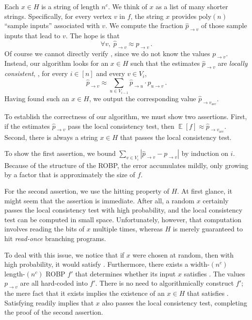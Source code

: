 \documentclass{toc}
\DeclareMathOperator*{\ExpVal}{\mathbb{E}}
\begin{document}
Each $x \in H$ is a string of length $n^c$. We think of $x$ as a list of many shorter strings. Specifically, for every vertex $v$ in $f$, the string $x$ provides $\text{poly}(n)$ ``sample inputs'' associated with $v$. We compute the fraction $\widehat{p}_{\to v}$ of those sample inputs that lead to $v$. The hope is that
\begin{equation} \label{eqn:intro-f'} 
\forall v, \; \widehat{p}_{\rightarrow v} \approx p_{\to v}\,.
\end{equation}
Of course we cannot directly verify , since we do not know the values $p_{\to v}$. Instead, our algorithm looks for an $x \in H$ such that the estimates $\widehat{p}_{\to v}$ are  \emph{locally consistent}, \ie, for every $i \in [n]$ and every $v \in V_i$,
$$
\widehat{p}_{\to v} \approx \sum_{u \in V_{i - 1}} \widehat{p}_{\to u} \cdot p_{u \to v}\,.
$$
Having found such an $x \in H$, we output the corresponding value $\widehat{p}_{\to v_{\text{acc}}}$.

To establish the correctness of our algorithm, we must show two assertions. First, if the estimates $\widehat{p}_{\to v}$ pass the local consistency test, then $\ExpVal[f] \approx \widehat{p}_{\to v_{\text{acc}}}$. Second, there is always a string $x\in H$ that passes the local consistency test.

To show the first assertion, we bound $\sum_{v \in V_i} |\widehat{p}_{\to v} - p_{\to v}|$ by induction on $i$. Because of the structure of the ROBP, the error accumulates mildly, only growing by a factor that is approximately the size of $f$.

For the second assertion, we use the hitting property of $H$. At first glance, it might seem that the assertion is immediate. After all, a random $x$ certainly passes the local consistency test with high probability, and the local consistency test can be computed in small space. Unfortunately, however, that computation involves reading the bits of $x$ multiple times, whereas $H$ is merely guaranteed to hit \emph{read-once} branching programs.

To deal with this issue, we notice that if $x$ were chosen at random, then with high probability, it would satisfy . Furthermore, there exists a width-$(n^c)$ length-$(n^c)$ ROBP $f'$ that determines whether its input $x$ satisfies . The values $p_{\to v}$ are all hard-coded into $f'$. There is no need to algorithmically construct $f'$; the mere fact that it exists implies the existence of an $x \in H$ that satisfies . Satisfying  readily implies that $x$ also passes the local consistency test, completing the proof of the second assertion.
\end{document}

